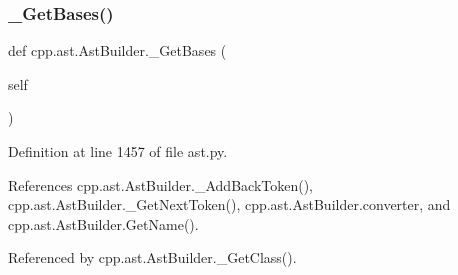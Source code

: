 \mbox{\label{classcpp_1_1ast_1_1AstBuilder_a5682851612e95587469f0c6d29d87e01}} 
\subsubsection{\texorpdfstring{\+\_\+\+Get\+Bases()}{\_GetBases()}}
{\footnotesize\ttfamily def cpp.\+ast.\+Ast\+Builder.\+\_\+\+Get\+Bases (\begin{DoxyParamCaption}\item[{}]{self }\end{DoxyParamCaption})\hspace{0.3cm}{\ttfamily [private]}}



Definition at line 1457 of file ast.\+py.



References cpp.\+ast.\+Ast\+Builder.\+\_\+\+Add\+Back\+Token(), cpp.\+ast.\+Ast\+Builder.\+\_\+\+Get\+Next\+Token(), cpp.\+ast.\+Ast\+Builder.\+converter, and cpp.\+ast.\+Ast\+Builder.\+Get\+Name().



Referenced by cpp.\+ast.\+Ast\+Builder.\+\_\+\+Get\+Class().


